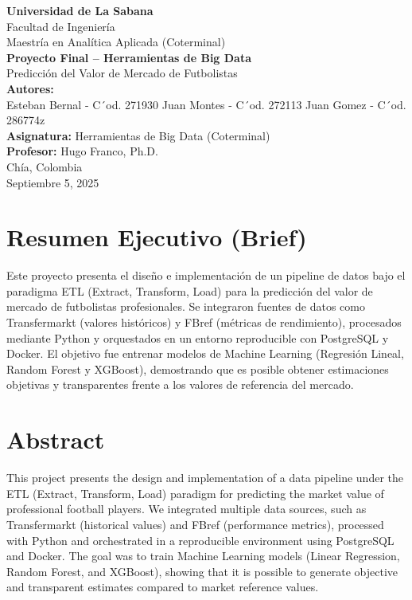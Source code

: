 \documentclass[12pt,letterpaper]{article}
\begin{document}
\begin{titlepage}
    \centering
    {\Large \textbf{Universidad de La Sabana}}\\[0.3cm]
    {\large Facultad de Ingeniería}\\[0.3cm]
    {\large Maestría en Analítica Aplicada (Coterminal)}\\[2cm]

    {\LARGE \textbf{Proyecto Final – Herramientas de Big Data}}\\[0.5cm]
    {\Large Predicción del Valor de Mercado de Futbolistas}\\[2cm]

    \textbf{Autores:}\\
   Esteban Bernal - C´od. 271930
    Juan Montes - C´od. 272113
    Juan Gomez - C´od. 286774z
 \\[0.5cm]

    \textbf{Asignatura:} Herramientas de Big Data (Coterminal)\\
    \textbf{Profesor:} Hugo Franco, Ph.D. \\[2cm]

    Chía, Colombia \\
    Septiembre 5, 2025

    \vfill
\end{titlepage}


\tableofcontents
\newpage


\section{Resumen Ejecutivo (Brief)}
Este proyecto presenta el diseño e implementación de un pipeline de datos bajo el paradigma ETL (Extract, Transform, Load) para la predicción del valor de mercado de futbolistas profesionales. 
Se integraron fuentes de datos como Transfermarkt (valores históricos) y FBref (métricas de rendimiento), procesados mediante Python y orquestados en un entorno reproducible con PostgreSQL y Docker. 
El objetivo fue entrenar modelos de Machine Learning (Regresión Lineal, Random Forest y XGBoost), demostrando que es posible obtener estimaciones objetivas y transparentes frente a los valores de referencia del mercado.



\section{Abstract}
This project presents the design and implementation of a data pipeline under the ETL (Extract, Transform, Load) paradigm for predicting the market value of professional football players. 
We integrated multiple data sources, such as Transfermarkt (historical values) and FBref (performance metrics), processed with Python and orchestrated in a reproducible environment using PostgreSQL and Docker. 
The goal was to train Machine Learning models (Linear Regression, Random Forest, and XGBoost), showing that it is possible to generate objective and transparent estimates compared to market reference values.
\end{document}

